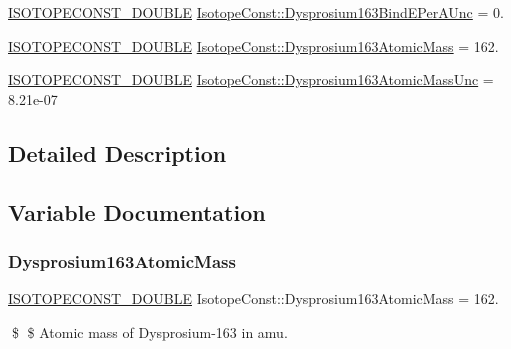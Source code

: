 \begin{DoxyCompactItemize}
\mbox{\hyperlink{group___isotope_const-_macros_ga8f45a7272ce02c0b4c65c44636ed719a}{I\+S\+O\+T\+O\+P\+E\+C\+O\+N\+S\+T\+\_\+\+D\+O\+U\+B\+LE}} \mbox{\hyperlink{group___isotope_const-_dysprosium-_dy163_ga666dbdbd0c57ba03763d79313200a3c4}{Isotope\+Const\+::\+Dysprosium163\+Bind\+E\+Per\+A\+Unc}} = 0.
\item 
\mbox{\hyperlink{group___isotope_const-_macros_ga8f45a7272ce02c0b4c65c44636ed719a}{I\+S\+O\+T\+O\+P\+E\+C\+O\+N\+S\+T\+\_\+\+D\+O\+U\+B\+LE}} \mbox{\hyperlink{group___isotope_const-_dysprosium-_dy163_ga8107f43ff655ea88ec7499144871bad1}{Isotope\+Const\+::\+Dysprosium163\+Atomic\+Mass}} = 162.
\item 
\mbox{\hyperlink{group___isotope_const-_macros_ga8f45a7272ce02c0b4c65c44636ed719a}{I\+S\+O\+T\+O\+P\+E\+C\+O\+N\+S\+T\+\_\+\+D\+O\+U\+B\+LE}} \mbox{\hyperlink{group___isotope_const-_dysprosium-_dy163_gad9e7e2e88fc5fb4cc0d881a9ebbc7769}{Isotope\+Const\+::\+Dysprosium163\+Atomic\+Mass\+Unc}} = 8.\+21e-\/07
\end{DoxyCompactItemize}


\subsection{Detailed Description}


\subsection{Variable Documentation}
\mbox{\label{group___isotope_const-_dysprosium-_dy163_ga8107f43ff655ea88ec7499144871bad1}} 
\subsubsection{\texorpdfstring{Dysprosium163\+Atomic\+Mass}{Dysprosium163AtomicMass}}
{\footnotesize\ttfamily \mbox{\hyperlink{group___isotope_const-_macros_ga8f45a7272ce02c0b4c65c44636ed719a}{I\+S\+O\+T\+O\+P\+E\+C\+O\+N\+S\+T\+\_\+\+D\+O\+U\+B\+LE}} Isotope\+Const\+::\+Dysprosium163\+Atomic\+Mass = 162.}

\$ \$ Atomic mass of Dysprosium-\/163 in amu. \mbox{\label{group___isotope_const-_dysprosium-_dy163_gad9e7e2e88fc5fb4cc0d881a9ebbc7769}} 
